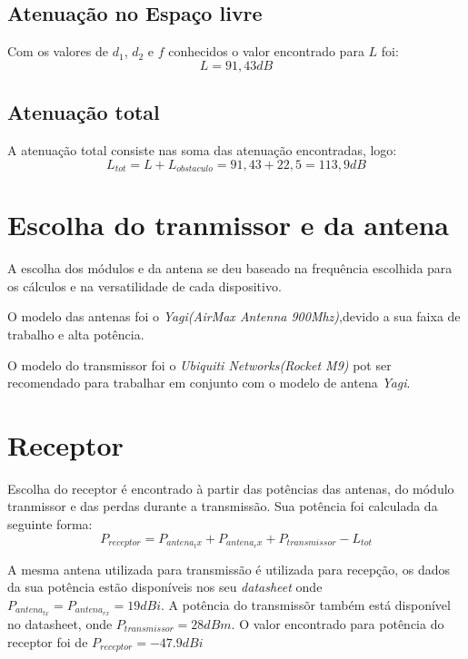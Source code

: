 \subsection{Atenuação no Espaço livre}
Com os valores de $d_1$, $d_2$ e $f$ conhecidos o valor encontrado para $L$ foi:
\begin{equation}
L = 91,43dB
\end{equation}

\subsection{Atenuação total}
A atenuação total consiste nas soma das atenuação encontradas, logo:
\begin{equation}
L_{tot} = L + L_{obstaculo} = 91,43 + 22,5 = 113,9dB 
\end{equation} 

\section{Escolha do tranmissor e da antena}
 A escolha dos módulos e da antena se deu baseado na frequência escolhida para os cálculos e na versatilidade de cada dispositivo. 
 
 O modelo das antenas foi o \textit{Yagi(AirMax Antenna 900Mhz)},devido a sua faixa de trabalho e alta potência.
 
 O modelo do transmissor foi o \textit{Ubiquiti Networks(Rocket M9)} pot ser recomendado para trabalhar em conjunto com o modelo de antena \textit{Yagi}.

\section{Receptor}
Escolha do receptor é encontrado à partir das potências das antenas, do módulo tranmissor e das perdas durante a transmissão. Sua potência foi calculada da seguinte forma:
\begin{equation}
	P_{receptor} = P_{antena_tx} + P_{antena_rx} + P_{transmissor} - L_{tot}
\end{equation}

A mesma antena utilizada para transmissão é utilizada para recepção, os dados da sua potência estão disponíveis nos seu \textit{datasheet} onde $P_{antena_{tx}} = P_{antena_{rx}} = 19dBi$. A potência do transmissõr também está disponível no datasheet, onde $P_{transmissor} = 28dBm$. O valor encontrado para potência do receptor foi de $	P_{receptor} = -47.9dBi$

